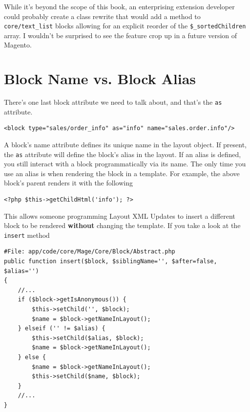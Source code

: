 \documentclass[oneside]{book}
\begin{document}
While it's beyond the scope of this book, an enterprising extension developer could probably create a class rewrite that would add a method to \footnotesize\texttt{core/text\_list} \normalsize  blocks allowing for an explicit reorder of the \footnotesize\texttt{\$\_sortedChildren} \normalsize  array. I wouldn't be surprised to see the feature crop up in a future version of Magento.

\section{Block Name vs. Block Alias}

There's one last block attribute we need to talk about, and that's the \footnotesize\texttt{as} \normalsize  attribute.

\begin{lstlisting}
<block type="sales/order_info" as="info" name="sales.order.info"/>

\end{lstlisting}


A block's name attribute defines its unique name in the layout object.  If present, the \footnotesize\texttt{as} \normalsize  attribute will define the block's alias in the layout.  If an alias is defined, you still interact with a block programmatically via its name.  The only time you use an alias is when rendering the block in a template.  For example, the above block's parent renders it with the following

\begin{lstlisting}
<?php $this->getChildHtml('info'); ?>

\end{lstlisting}


This allows someone programming Layout XML Updates to insert a different block to be rendered \textbf{without} changing the template. If you take a look at the \footnotesize\texttt{insert} \normalsize  method

\begin{lstlisting}
#File: app/code/core/Mage/Core/Block/Abstract.php
public function insert($block, $siblingName='', $after=false, $alias='')
{
    //...
    if ($block->getIsAnonymous()) {
        $this->setChild('', $block);
        $name = $block->getNameInLayout();
    } elseif ('' != $alias) {
        $this->setChild($alias, $block);
        $name = $block->getNameInLayout();
    } else {
        $name = $block->getNameInLayout();
        $this->setChild($name, $block);
    }
    //...
}

\end{lstlisting}
\end{document}
